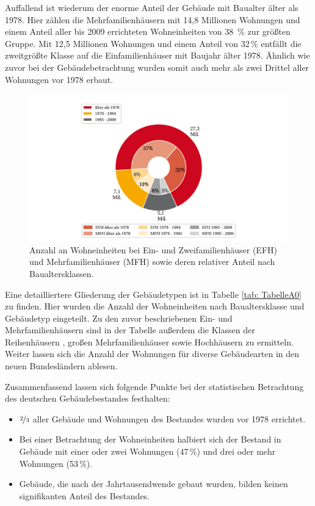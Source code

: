 Auffallend ist wiederum der enorme Anteil der Gebäude mit Baualter älter als 1978. 
Hier zählen die Mehrfamilienhäusern mit 14,8 Millionen Wohnungen und einem Anteil aller bis 2009 errichteten Wohneinheiten von \mbox{38 \%} zur größten Gruppe. 
Mit 12,5 Millionen Wohnungen und einem Anteil von 32\,\% entfällt die zweitgrößte Klasse auf die Einfamilienhäuser mit Baujahr älter 1978.
Ähnlich wie zuvor bei der Gebäudebetrachtung wurden somit auch mehr als zwei Drittel aller Wohnungen vor 1978 erbaut.

\begin{figure}[H]
	\centering
		\includegraphics{Pictures/GebaeudeGroesse.jpg}
	\caption{Anzahl an Wohneinheiten bei Ein- und Zweifamilienhäuser (EFH) und Mehrfamilienhäuser (MFH) sowie deren relativer Anteil nach Baualtersklassen. \cite{StatistischeAmterdesBundesundderLander.2014b}}
	\label{fig: Abbildung212} 
\end{figure}

Eine detailliertere Gliederung der Gebäudetypen ist in Tabelle \ref{tab: TabelleA0} zu finden. 
Hier wurden die Anzahl der Wohneinheiten nach Baualtersklasse und Gebäudetyp eingeteilt. 
Zu den zuvor beschriebenen Ein- und Mehrfamilienhäusern sind in der Tabelle außerdem die Klassen der Reihenhäusern , großen Mehrfamilienhäuser sowie Hochhäusern zu ermitteln. 
Weiter lassen sich die Anzahl der Wohnungen für diverse Gebäudearten in den neuen Bundesländern ablesen.

Zusammenfassend lassen sich folgende Punkte bei der statistischen Betrachtung des deutschen Gebäudebestandes festhalten:

\begin{itemize}
	\item $\nicefrac{2}{3}$ aller Gebäude und Wohnungen des Bestandes wurden vor 1978 errichtet.
	\item Bei einer Betrachtung der Wohneinheiten halbiert sich der Bestand in Gebäude mit einer oder zwei Wohnungen (47\,\%) und drei oder mehr Wohnungen (53\,\%).
	\item Gebäude, die nach der Jahrtausendwende gebaut wurden, bilden keinen signifikanten Anteil des Bestandes.
\end{itemize}

